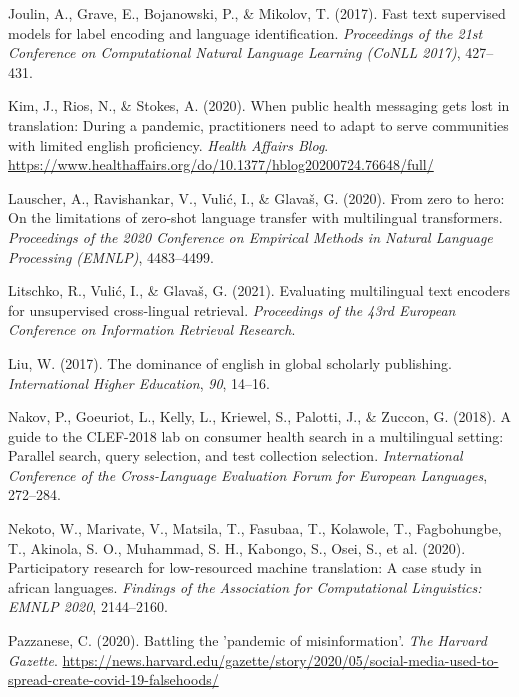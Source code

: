 \documentclass[
]{article}
\newlength{\cslhangindent}
\newenvironment{CSLReferences}[2] %
 {\begin{list}{}{%
  \setlength{\itemindent}{0pt}
  \setlength{\leftmargin}{0pt}
  \setlength{\parsep}{0pt}
  \ifodd #1
   \setlength{\leftmargin}{\cslhangindent}
   \setlength{\itemindent}{-1\cslhangindent}
  \fi
  \setlength{\itemsep}{#2\baselineskip}}}
 {\end{list}}
\begin{document}
\begin{CSLReferences}{1}{0}
Joulin, A., Grave, E., Bojanowski, P., \& Mikolov, T. (2017). Fast text
supervised models for label encoding and language identification.
\emph{Proceedings of the 21st Conference on Computational Natural
Language Learning (CoNLL 2017)}, 427--431.

Kim, J., Rios, N., \& Stokes, A. (2020). When public health messaging
gets lost in translation: During a pandemic, practitioners need to adapt
to serve communities with limited english proficiency. \emph{Health
Affairs Blog}.
\url{https://www.healthaffairs.org/do/10.1377/hblog20200724.76648/full/}

Lauscher, A., Ravishankar, V., Vulić, I., \& Glavaš, G. (2020). From
zero to hero: On the limitations of zero-shot language transfer with
multilingual transformers. \emph{Proceedings of the 2020 Conference on
Empirical Methods in Natural Language Processing (EMNLP)}, 4483--4499.

Litschko, R., Vulić, I., \& Glavaš, G. (2021). Evaluating multilingual
text encoders for unsupervised cross-lingual retrieval.
\emph{Proceedings of the 43rd European Conference on Information
Retrieval Research}.

Liu, W. (2017). The dominance of english in global scholarly publishing.
\emph{International Higher Education}, \emph{90}, 14--16.

Nakov, P., Goeuriot, L., Kelly, L., Kriewel, S., Palotti, J., \& Zuccon,
G. (2018). A guide to the CLEF-2018 lab on consumer health search in a
multilingual setting: Parallel search, query selection, and test
collection selection. \emph{International Conference of the
Cross-Language Evaluation Forum for European Languages}, 272--284.

Nekoto, W., Marivate, V., Matsila, T., Fasubaa, T., Kolawole, T.,
Fagbohungbe, T., Akinola, S. O., Muhammad, S. H., Kabongo, S., Osei, S.,
et al. (2020). Participatory research for low-resourced machine
translation: A case study in african languages. \emph{Findings of the
Association for Computational Linguistics: EMNLP 2020}, 2144--2160.

Pazzanese, C. (2020). Battling the 'pandemic of misinformation'.
\emph{The Harvard Gazette}.
\url{https://news.harvard.edu/gazette/story/2020/05/social-media-used-to-spread-create-covid-19-falsehoods/}


\end{CSLReferences}
\end{document}
